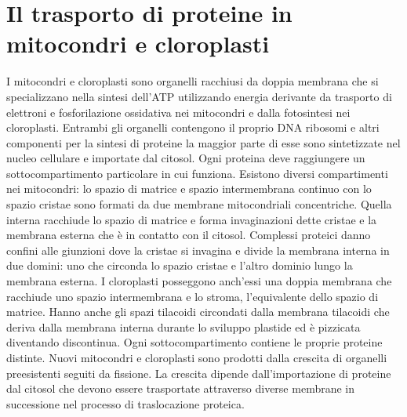 \section{Il trasporto di proteine in mitocondri e cloroplasti}
I mitocondri e cloroplasti sono organelli racchiusi da doppia membrana che si specializzano nella sintesi dell'ATP utilizzando energia derivante da trasporto di elettroni e
fosforilazione ossidativa nei mitocondri e dalla fotosintesi nei cloroplasti. Entrambi gli organelli contengono il proprio DNA ribosomi e altri componenti per la sintesi di proteine
la maggior parte di esse sono sintetizzate nel nucleo cellulare e importate dal citosol. Ogni proteina deve raggiungere un sottocompartimento particolare in cui funziona. Esistono 
diversi compartimenti nei mitocondri: lo spazio di matrice e spazio intermembrana continuo con lo spazio cristae sono formati da due membrane mitocondriali concentriche. Quella 
interna racchiude lo spazio di matrice e forma invaginazioni dette cristae e la membrana esterna che \`e in contatto con il citosol. Complessi proteici danno confini alle 
giunzioni dove la cristae si invagina e divide la membrana interna in due domini: uno che circonda lo spazio cristae e l'altro dominio lungo la membrana esterna. I cloroplasti posseggono
anch'essi una doppia membrana che racchiude uno spazio intermembrana e lo stroma, l'equivalente dello spazio di matrice. Hanno anche gli spazi tilacoidi circondati dalla membrana
tilacoidi che deriva dalla membrana interna durante lo sviluppo plastide ed \`e pizzicata diventando discontinua. Ogni sottocompartimento contiene le proprie proteine distinte. 
Nuovi mitocondri e cloroplasti sono prodotti dalla crescita di organelli preesistenti seguiti da fissione. La crescita dipende dall'importazione di proteine dal citosol che devono 
essere trasportate attraverso diverse membrane in successione nel processo di traslocazione proteica. 
